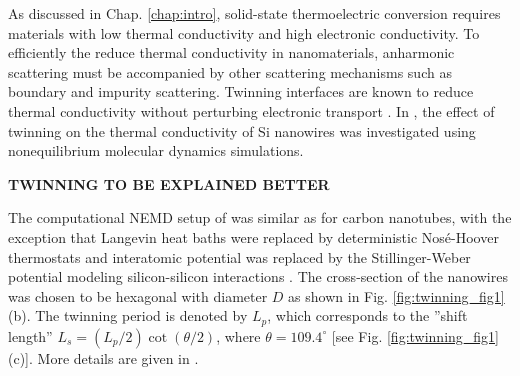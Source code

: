 As discussed in Chap. \ref{chap:intro}, solid-state thermoelectric conversion requires materials with low thermal conductivity and high electronic conductivity. To efficiently the reduce thermal conductivity in nanomaterials, anharmonic scattering must be accompanied by other scattering mechanisms such as boundary and impurity scattering. Twinning interfaces are known to reduce thermal conductivity without perturbing electronic transport \cite{}. In , the effect of twinning on the thermal conductivity of Si nanowires was investigated using nonequilibrium molecular dynamics simulations.

\textbf{TWINNING TO BE EXPLAINED BETTER}


The computational NEMD setup of  was similar as for carbon nanotubes, with the exception that Langevin heat baths were replaced by deterministic Nos\'e-Hoover thermostats \cite{nose84} and interatomic potential was replaced by the Stillinger-Weber potential modeling silicon-silicon interactions \cite{stillinger85}. The cross-section of the nanowires was chosen to be hexagonal with diameter $D$ as shown in Fig. \ref{fig:twinning_fig1}(b). The twinning period is denoted by $L_p$, which corresponds to the ''shift length'' $L_s=(L_p/2)\cot(\theta/2)$, where $\theta=109.4^{\circ}$ [see Fig. \ref{fig:twinning_fig1}(c)]. More details are given in .


